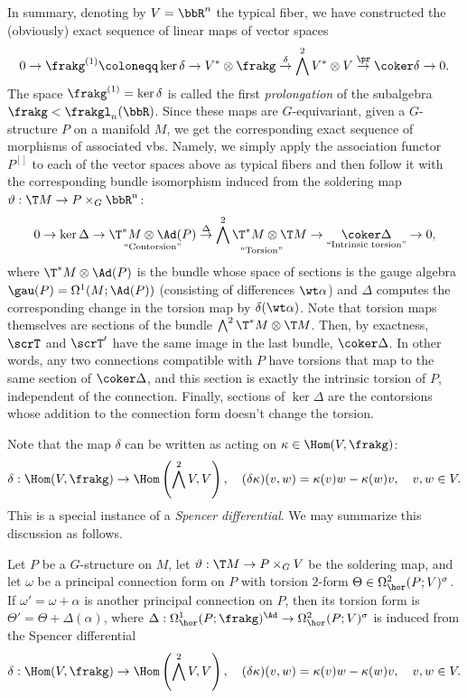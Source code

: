 In summary, denoting by $V=\bbR^n$ the typical fiber, we have constructed the (obviously) exact sequence of linear maps of vector spaces
\[0\to\frakg^{(1)}\coloneqq\ker\delta\to V^\ast\otimes\frakg\overset{\delta}{\to}\bigwedge^2 V^\ast \otimes V\overset{\pr}{\to}\coker\delta\to 0.\]
The space $\frakg^{(1)}=\ker\delta$ is called the first \emph{prolongation} of the subalgebra $\frakg<\frakgl_n(\bbR)$. Since these maps are $G$-equivariant, given a $G$-structure $P$ on a manifold $M$, we get the corresponding exact sequence of morphisms of associated \glspl{vb}. Namely, we simply apply the association functor $P^{[]}$ to each of the vector spaces above as typical fibers and then follow it with the corresponding bundle isomorphism induced from the soldering map $\vartheta:\T M\to P\times_G \bbR^n$:
\[ 0\to \ker \Delta \to \underset{\text{``Contorsion''}}{\T^\ast M\otimes \Ad(P)}\overset{\Delta}{\to} \underset{\text{``Torsion''}}{\bigwedge^2 \T^\ast M\otimes \T M}\to \underset{\text{``Intrinsic torsion''}}{\coker \Delta}\to 0,\]
where $ \T^\ast M\otimes \Ad(P)$ is the bundle whose space of sections is the gauge algebra $\gau(P)=\Omega^1(M;\Ad(P))$ (consisting of differences $\wt\alpha$) and $\Delta$ computes  the corresponding change in the torsion map by $\delta(\wt\alpha)$. Note that torsion maps themselves are sections of the bundle $\bigwedge^2 \T^\ast M\otimes \T M$. Then, by exactness, $\scrT$ and $\scrT'$ have the same image in the last bundle, $\coker\Delta$. In other words, any two connections compatible with $P$ have torsions that map to the same section of $\coker\Delta$, and this section is exactly the intrinsic torsion of $P$, independent of the connection. Finally, sections of $\ker\Delta$ are the contorsions whose addition to the connection form doesn't change the torsion.

Note that the map $\delta$ can be written as acting on $\kappa\in\Hom(V,\frakg)$:
\[\delta:\Hom(V,\frakg)\to \Hom\left(\bigwedge^2 V,V\right),\quad (\delta\kappa)(v,w)=\kappa(v) w-\kappa(w) v,\quad v,w\in V.\]
This is a special instance  of a \emph{Spencer differential}. We may summarize this discussion as follows.

\begin{prop}
    Let $P$ be a $G$-structure on $M$, let $\vartheta:\T M\to P\times_G V$ be the soldering map, and let $\omega$ be a principal connection form on $P$ with torsion $2$-form $\Theta\in\Omega^2_{\hor}(P;V)^\sigma$. If $\omega'=\omega+\alpha$ is another principal connection on $P$, then its torsion form is $\Theta'=\Theta+\Delta(\alpha)$, where $\Delta:\Omega^1_{\hor}(P;\frakg)^\Ad\to \Omega^2_{\hor}(P;V)^\sigma$ is induced from the Spencer differential 
    \[\delta:\Hom(V,\frakg)\to \Hom\left(\bigwedge^2 V,V\right),\quad (\delta\kappa) (v,w)=\kappa(v)w-\kappa(w)v,\quad v,w\in V.\]
\end{prop}

